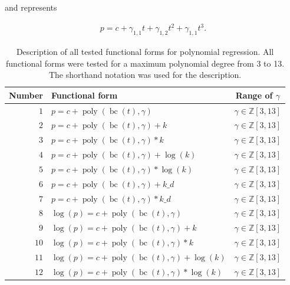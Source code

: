 \documentclass[12pt,a4paper]{article}
\DeclareMathOperator{\bc}{bc}
\DeclareMathOperator{\poly}{poly}
\begin{document}
and represents

\begin{align}
    p = c + \gamma_{1,1} t + \gamma_{1,2} t^2 + \gamma_{1,1} t^3 .
\end{align}

\begin{table}
    \centering
    \caption{Description of all tested functional forms for polynomial regression. All functional forms were tested for a maximum polynomial degree from 3 to 13. The shorthand notation was used for the description.}
    \label{tab:func_form}    
    \begin{tabular}{rlc}
        Number & Functional form & Range of $\gamma$ \\
        \toprule
        $1$ & $p = c + \poly\left( \bc(t), \gamma \right) $ & $\gamma \in \mathbb{Z} \left[3, 13 \right]$\\ 
        $2$ & $p = c + \poly\left( \bc(t), \gamma \right) + k $ & $\gamma \in \mathbb{Z} \left[3, 13 \right]$\\
        $3$ & $p = c + \poly\left( \bc(t), \gamma \right) * k $ & $\gamma \in \mathbb{Z} \left[3, 13 \right]$\\
        $4$ & $p = c + \poly\left( \bc(t), \gamma \right) + \log(k) $ & $\gamma \in \mathbb{Z} \left[3, 13 \right]$\\
        $5$ & $p = c + \poly\left( \bc(t), \gamma \right) * \log(k) $ & $\gamma \in \mathbb{Z} \left[3, 13 \right]$\\
        $6$ & $p = c + \poly\left( \bc(t), \gamma \right) + k\_d $ & $\gamma \in \mathbb{Z} \left[3, 13 \right]$\\
        $7$ & $p = c + \poly\left( \bc(t), \gamma \right) * k\_d $ & $\gamma \in \mathbb{Z} \left[3, 13 \right]$\\ %
        \midrule
        $8$ & $\log(p) = c + \poly\left( \bc(t), \gamma \right) $ & $\gamma \in \mathbb{Z} \left[3, 13 \right]$\\ 
        $9$ & $\log(p) = c + \poly\left( \bc(t), \gamma \right) + k $ & $\gamma \in \mathbb{Z} \left[3, 13 \right]$\\
        $10$ & $\log(p) = c + \poly\left( \bc(t), \gamma \right) * k $ & $\gamma \in \mathbb{Z} \left[3, 13 \right]$\\
        $11$ & $\log(p) = c + \poly\left( \bc(t), \gamma \right) + \log(k) $ & $\gamma \in \mathbb{Z} \left[3, 13 \right]$\\
        $12$ & $\log(p) = c + \poly\left( \bc(t), \gamma \right) * \log(k) $ & $\gamma \in \mathbb{Z} \left[3, 13 \right]$\\

\end{tabular}
\end{table}
\end{document}
